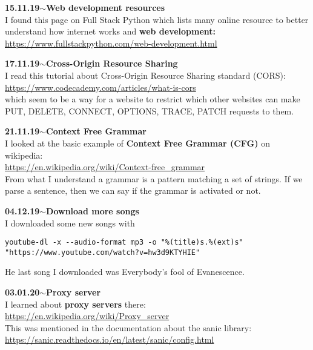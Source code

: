 \documentclass[11pt,a4paper]{article}
\newenvironment{loggentry}[2]%
{\noindent\textbf{#1}\hspace{1cm}$\mathbf{\sim}$\text{ }\textbf{#2}\\}{\vspace{0.5cm}}
\begin{document}
\begin{loggentry}{15.11.19}{Web development resources}

I found this page on Full Stack Python which lists many online resource to better understand how internet works and \textbf{web development:}\\
\url{https://www.fullstackpython.com/web-development.html}

\end{loggentry}


\begin{loggentry}{17.11.19}{Cross-Origin Resource Sharing}

I read this tutorial about Cross-Origin Resource Sharing standard (CORS):\\
\url{https://www.codecademy.com/articles/what-is-cors}\\
which seem to be a way for a website to restrict which other websites can make PUT, DELETE, CONNECT, OPTIONS, TRACE, PATCH requests to them.

\end{loggentry}


\begin{loggentry}{21.11.19}{Context Free Grammar}

I looked at the basic example of \textbf{Context Free Grammar (CFG)} on wikipedia:\\
\url{https://en.wikipedia.org/wiki/Context-free_grammar}\\
From what I understand a grammar is a pattern matching a set of strings. If we parse a sentence, then we can say if the grammar is activated or not.

\end{loggentry}


\begin{loggentry}{04.12.19}{Download more songs}

I downloaded some new songs with
\begin{verbatim}
youtube-dl -x --audio-format mp3 -o "%(title)s.%(ext)s" "https://www.youtube.com/watch?v=hw3d9KTYHIE"
\end{verbatim}

He last song I downloaded was Everybody's fool of Evanescence.\\

\end{loggentry}


\begin{loggentry}{03.01.20}{Proxy server}

I learned about \textbf{proxy servers} there:\\
\url{https://en.wikipedia.org/wiki/Proxy_server}\\
This was mentioned in the documentation about the sanic library:\\
\url{https://sanic.readthedocs.io/en/latest/sanic/config.html}

\end{loggentry}
\end{document}
